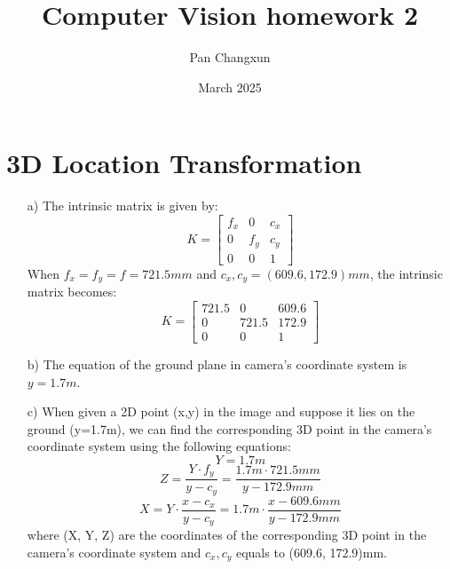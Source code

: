 \documentclass[]{article}
\title{\textbf{Computer Vision homework 2}}
\author{Pan Changxun}
\date{March 2025}
\begin{document}
\maketitle

\section{3D Location Transformation}
\begin{enumerate}
	\item[a)] The intrinsic matrix is given by:
	\begin{equation}
		K = \begin{bmatrix}
			f_x & 0 & c_x \\
			0 & f_y & c_y \\
			0 & 0 & 1
		\end{bmatrix}
	\end{equation}
	When \(f_x = f_y = f = 721.5mm\) and \(c_x, c_y = (609.6, 172.9)mm\), the intrinsic matrix becomes:
	\begin{equation}
		K = \begin{bmatrix}
			721.5 & 0 & 609.6 \\
			0 & 721.5 & 172.9 \\
			0 & 0 & 1
		\end{bmatrix}
	\end{equation}
	\item[b)] The equation of the ground plane in camera's coordinate system is \(y=1.7m\).
	\item[c)] When given a 2D point (x,y) in the image and suppose it lies on the ground (y=1.7m), we can find the corresponding 3D point in the camera's coordinate system using the following equations:
	\begin{equation}
		Y = 1.7m
	\end{equation}
	\begin{equation}
		Z = \frac{Y \cdot f_y}{y - c_y} = \frac{1.7m \cdot 721.5mm}{y - 172.9mm}
	\end{equation}
	\begin{equation}
		X = Y \cdot \frac{x - c_x}{y - c_y} = 1.7m \cdot \frac{x - 609.6mm}{y - 172.9mm}
	\end{equation}
	where (X, Y, Z) are the coordinates of the corresponding 3D point in the camera's coordinate system and \(c_x, c_y\) equals to (609.6, 172.9)mm.
\end{enumerate}
\end{document}
